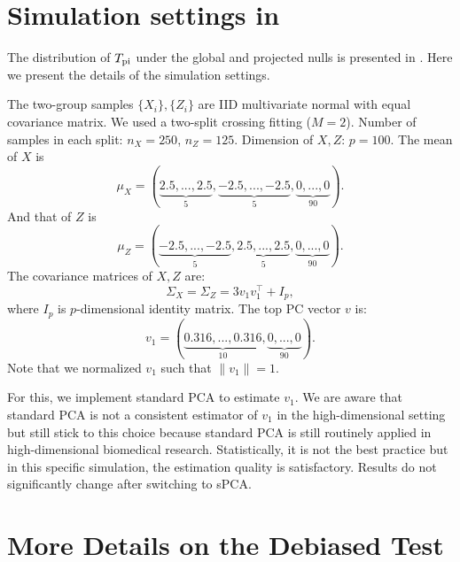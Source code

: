 \documentclass[11pt]{article}
\begin{document}
\vspace{2em}

\appendix

\renewcommand\thefigure{\thesection.\arabic{figure}}    
\section{Simulation settings in }
\label{app: for the figure}
The distribution of $T_{\rm pi}$ under the global and projected nulls is presented in . Here we present the details of the simulation settings.

The two-group samples $\{X_i\}, \{Z_i\}$ are IID multivariate normal with equal covariance matrix. We used a two-split crossing fitting ($M=2$). Number of samples in each split: $n_X = 250$, $n_Z = 125$. Dimension of $X,Z$: $p = 100$. The mean of $X$ is
\begin{equation*}
    \mu_X = (\underbrace{2.5,...,2.5}_{5}, \underbrace{-2.5,...,-2.5}_{5}, \underbrace{0,...,0}_{90}).
\end{equation*}
And that of $Z$ is 
\begin{equation*}
    \mu_Z = (\underbrace{-2.5,...,-2.5}_{5}, \underbrace{2.5,...,2.5}_{5}, \underbrace{0,...,0}_{90}).
\end{equation*}
The covariance matrices of $X,Z$ are:
\begin{equation*}
    \Sigma_X = \Sigma_Z = 3v_1v_1^\top+I_p,
\end{equation*}
where $I_p$ is $p$-dimensional identity matrix. The top PC vector $v$ is:
\begin{equation*}
    v_1 = (\underbrace{0.316, ..., 0.316}_{10},\underbrace{0,...,0}_{90}).
\end{equation*}
Note that we normalized $v_1$ such that $\|v_1\| = 1$.

For this, we implement standard PCA to estimate $v_1$. We are aware that standard PCA is not a consistent estimator of $v_1$ in the high-dimensional setting but still stick to this choice because standard PCA is still routinely applied in high-dimensional biomedical research. Statistically, it is not the best practice but in this specific simulation, the estimation quality is satisfactory. Results do not significantly change after switching to sPCA.

\section{More Details on the Debiased Test}
\end{document}

